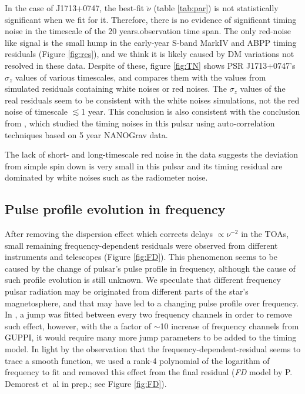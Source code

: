In the case of J1713+0747, the
best-fit $\ddot{\nu}$ (table \ref{tab:par}) is not statistically significant when we
fit for it. Therefore, there is no evidence of significant timing noise in the
timescale of the 20 years.observation time span. The only red-noise like
signal is the small hump in the early-year S-band MarkIV and ABPP timing residuals (Figure
\ref{fig:res}), and we think it is likely caused by DM variations not resolved in
these data.  Despite of these, figure \ref{fig:TN} 
shows PSR J1713+0747's $\sigma_z$ values of various timescales, and compares them
with the values from simulated residuals containing white noises or
red noises. The $\sigma_z$ values of the real residuals seem to be consistent 
with the white noises simulations, not the red noise of timescale 
$\lesssim$1 year. This
conclusion is also consistent with the conclusion from \citet{pjl+13}, which 
studied the timing noises in this pulsar using auto-correlation techniques 
based on 5 year NANOGrav data.

The lack of short- and long-timescale red noise in the data suggests the deviation from simple spin down is very small in this pulsar and its timing residual are dominated by white noises such as the radiometer noise.




\subsection{Pulse profile evolution in frequency}
\label{sec:FD}
After removing the dispersion effect which corrects delays $\propto \nu^{-2}$
in the TOAs, small remaining frequency-dependent residuals were observed from
different instruments and telescopes (Figure \ref{fig:FD}).  
This phenomenon seems to be caused by the change of pulsar's pulse profile in
frequency, although the cause of such profile evolution is still unknown.
We speculate that different frequency pulsar radiation may be originated from
different parts of the star's magnetosphere, and that may have led to a
changing pulse profile over frequency.
In \citet{sns+05}, a jump was fitted between every two frequency channels in
order to remove such effect, however, with the a factor of $\sim$10 increase
of frequency channels from GUPPI, it would require many more jump parameters
to be added to the timing model.
In light by the observation that the frequency-dependent-residual seems to
trace a smooth function, we used a rank-4 polynomial of the logarithm of
frequency to fit and removed this effect from the final residual ({\it FD}
model by P. Demorest et~al in prep.; see Figure \ref{fig:FD}). 



